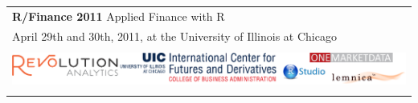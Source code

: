 \documentclass[letterpaper,10pt]{article}
\newcommand{\ra}[1]{\renewcommand{\arraystretch}{#1}}  %
\begin{document}
\thispagestyle{empty}


\ra{1.1} \sf

\begin{tabular}{rlrlp{5in}} %

  \multicolumn{5}{l}{\Huge \textbf{\color{KeynoteTalk} R/Finance 2011} \huge \phantom{i} Applied Finance with R} \\
  \multicolumn{5}{l}{\large \color{Breaks} April 29th and 30th, 2011, at the University of Illinois at Chicago} \\[3pt]

  \bottomrule \\

  \multicolumn{5}{l}{
    \centering
    \includegraphics[page=1,scale=1]{2011Sponsors.pdf}
  } \\[5pt]

  \bottomrule \\[3pt]


\end{tabular}
\end{document}
